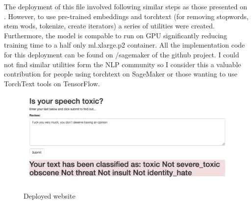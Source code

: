 \documentclass{report}
\begin{document}
The deployment of this file involved following similar steps as those presented on \cite{Udacity}. However, 
to use pre-trained embeddings and torchtext (for removing stopwords, stem wods, tokenize, create iterators)
a series of utilities were created. Furthermore, the model is compable to run on GPU significantly reducing 
training time to a half only ml.xlarge.p2 container. All the implementation code for this deployment can be found on
/sagemaker of the github project. I could not find similar utilities form the NLP community so I consider this a valuable
contribution for people using torchtext on SageMaker or those wanting to use TorchText tools on TensorFlow. 


\begin{figure}[!h]
\centering
  \includegraphics[width=160mm]{../local/plots_tables/website.png}
  \caption{Deployed website}
  \label{fig:website}
\end{figure}





\end{document}

